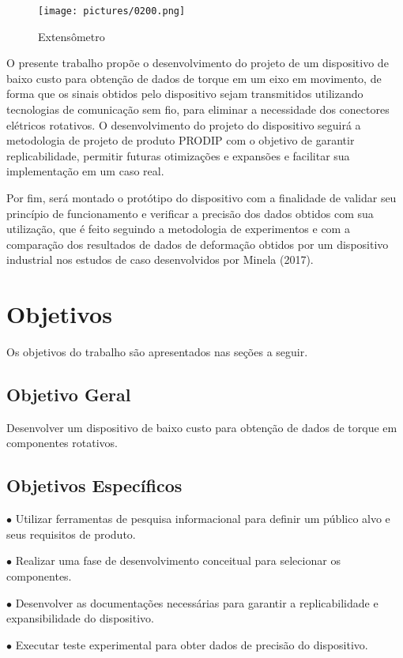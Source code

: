 \begin{figure}[H]
	\caption{\label{fig:0200} Extensômetro}
	\begin{center}
		\texttt{[image: pictures/0200.png]}
	\end{center}
\end{figure}

O presente trabalho propõe o desenvolvimento do projeto de um dispositivo de baixo custo para obtenção de dados de torque em um eixo em movimento, de forma que os sinais obtidos pelo dispositivo
sejam transmitidos utilizando tecnologias de comunicação sem fio, para eliminar a necessidade dos conectores elétricos rotativos.
O desenvolvimento do projeto do dispositivo seguirá a metodologia de projeto de produto PRODIP com o objetivo de garantir replicabilidade, permitir futuras otimizações e expansões e facilitar sua
implementação em um caso real.

Por fim, será montado o protótipo do dispositivo com a finalidade de validar seu princípio de funcionamento e verificar a precisão dos dados obtidos com sua utilização, que é feito seguindo a
metodologia de experimentos e com a comparação dos resultados de dados de deformação obtidos por um dispositivo industrial nos estudos de caso desenvolvidos por Minela (2017).

\section{Objetivos}

Os objetivos do trabalho são apresentados nas seções a seguir.

\subsection{Objetivo Geral}

Desenvolver um dispositivo de baixo custo para obtenção de dados de torque em componentes rotativos.

\subsection{Objetivos Específicos}

$\bullet$ Utilizar ferramentas de pesquisa informacional para definir um público alvo e seus requisitos de produto.

$\bullet$ Realizar uma fase de desenvolvimento conceitual para selecionar os componentes.

$\bullet$ Desenvolver as documentações necessárias para garantir a replicabilidade e expansibilidade do dispositivo.

$\bullet$ Executar teste experimental para obter dados de precisão do dispositivo.
